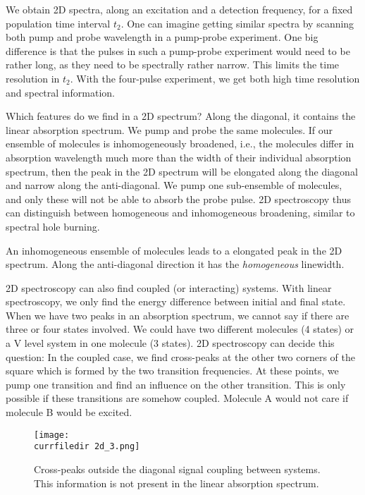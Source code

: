 We obtain 2D spectra, along an excitation and a detection frequency, for a fixed population time interval $t_2$. One can imagine getting similar spectra by scanning both pump and probe wavelength in a pump-probe experiment. One big difference is that the pulses in such a pump-probe experiment would need to be rather long, as they need to be spectrally rather narrow. This limits the time resolution in $t_2$. With the four-pulse experiment, we get both high time resolution and spectral information.

Which features do we find in a 2D spectrum? Along the diagonal, it contains the linear absorption spectrum. We pump and probe the same molecules. If our ensemble of molecules is inhomogeneously broadened, i.e., the molecules differ in absorption wavelength much more than the width of their individual absorption spectrum, then the peak in the 2D spectrum will be elongated along the diagonal and narrow along the anti-diagonal. We pump one sub-ensemble of molecules, and only these will not be able to absorb the probe pulse. 2D spectroscopy thus can distinguish between homogeneous and inhomogeneous broadening, similar to spectral hole burning.


\begin{marginfigure}

\caption{An inhomogeneous ensemble of molecules leads to a elongated peak in the 2D spectrum. Along the anti-diagonal direction it has the \emph{homogeneous} linewidth.}
\label{fig:2d_inhom_broadening}
\end{marginfigure}



2D spectroscopy can also find coupled (or interacting) systems. With linear spectroscopy, we only find the energy difference between initial and final state. When we have two peaks in an absorption spectrum, we cannot say if there are three or four states involved. We could have two  different molecules (4 states) or a V level system in one molecule (3 states). 2D spectroscopy can decide this question: In the coupled case, we find cross-peaks at the  other two corners  of the square which is formed by the two transition frequencies. At these points, we pump one transition and find an influence on the other transition. This is only possible if these transitions are somehow coupled. Molecule A would not care if molecule B would be excited.

\begin{figure}
\texttt{[image: \\currfiledir 2d\_3.png]}
\caption{Cross-peaks outside the diagonal signal coupling between systems. This information is not present in the linear absorption spectrum.}
\label{fig_2d_crosspeak}
\end{figure}


